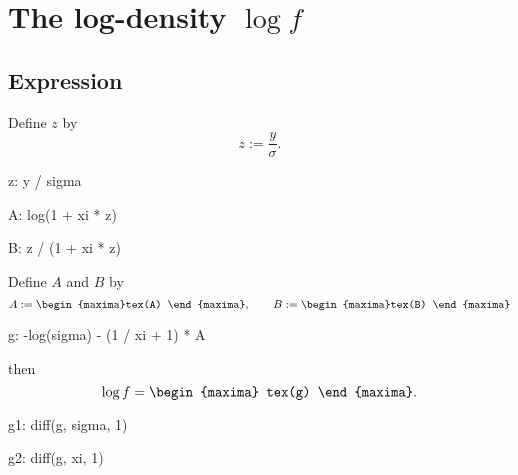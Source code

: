 

\section{The log-density $\log f$}

\subsection{Expression}

Define $z$ by
\begin{equation}
  \label{eq:defz}
  z := \frac{y}{\sigma}.
\end{equation}

\begin{maxima}%
  z: y / sigma
\end{maxima}%
\begin{maxima}%
  A: log(1 + xi * z)
\end{maxima}
\begin{maxima}%
  B: z / (1 + xi * z)
\end{maxima}%
\noindent
Define $A$  and $B$ by
\begin{equation}
  \label{eq:defAB}
A := 
\begin{maxima}%
tex(A)
\end{maxima},%
\qquad
B :=
\begin{maxima}%
tex(B)
\end{maxima}%
\end{equation}
\begin{maxima}%
  g: -log(sigma) - (1 / xi + 1) * A 
\end{maxima}%
\noindent then
\[
\log f = 
\begin{maxima}
  tex(g)
\end{maxima}.
\]

\begin{maxima}
  g1: diff(g, sigma, 1)
\end{maxima}%
\begin{maxima}
  g2: diff(g, xi, 1)
\end{maxima}%


